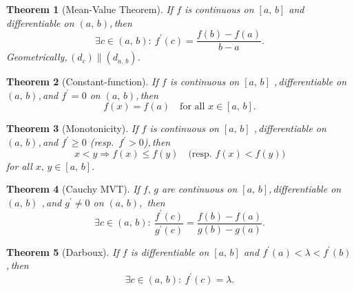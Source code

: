 \documentclass[11pt,reqno]{amsart}
\theoremstyle{redplain}
\newtheorem{theorem}{Theorem}
\begin{document}
\begin{theorem}[Mean-Value Theorem]
\label{thm:mvt} If $f$ is continuous on $[a,\,\allowbreak b]$ and
differentiable on $(a,\,\allowbreak b)$,\,\allowbreak then 
\begin{equation}  \label{eq:mvt}
\exists c\in(a,\,\allowbreak b):\ f^{\prime }(c)=\frac{f(b)-f(a)}{b-a}.
\end{equation}
Geometrically,\,\allowbreak $(d_c)\parallel (d_{a,\,\allowbreak b})$.
\end{theorem}

\begin{theorem}[Constant-function]
\label{thm:const} If $f$ is continuous on $[a,\,\allowbreak b]$%
,\,\allowbreak differentiable on $(a,\,\allowbreak b)$,\,\allowbreak and $%
f^{\prime }=0$ on $(a,\,\allowbreak b)$,\,\allowbreak then 
\begin{equation}  \label{eq:const}
f(x)=f(a)\quad\text{for all }x\in[a,\,\allowbreak b].
\end{equation}
\end{theorem}

\begin{theorem}[Monotonicity]
\label{thm:monotone} If $f$ is continuous on $[a,\,\allowbreak b]$%
,\,\allowbreak differentiable on $(a,\,\allowbreak b)$,\,\allowbreak and $%
f^{\prime }\ge0$ (resp.\ $f^{\prime }>0$),\,\allowbreak then 
\begin{equation}  \label{eq:monotone}
x<y\Rightarrow f(x)\le f(y)\quad\text{(resp.\ }f(x)<f(y)\text{)}
\end{equation}
for all $x,\,\allowbreak y\in[a,\,\allowbreak b]$.
\end{theorem}

\begin{theorem}[Cauchy MVT]
\label{thm:cauchy-mvt} If $f,\,\allowbreak g$ are continuous on $%
[a,\,\allowbreak b]$,\,\allowbreak differentiable on $(a,\,\allowbreak b)$%
,\,\allowbreak and $g^{\prime }\ne0$ on $(a,\,\allowbreak b)$,\,\allowbreak
then 
\begin{equation}  \label{eq:cauchy-mvt}
\exists c\in(a,\,\allowbreak b):\ \frac{f^{\prime }(c)}{g^{\prime }(c)}=%
\frac{f(b)-f(a)}{g(b)-g(a)}.
\end{equation}
\end{theorem}

\begin{theorem}[Darboux]
\label{thm:darboux} If $f$ is differentiable on $[a,\,\allowbreak b]$ and $%
f^{\prime }(a)<\lambda<f^{\prime }(b)$,\,\allowbreak then 
\begin{equation}  \label{eq:darboux}
\exists c\in(a,\,\allowbreak b):\ f^{\prime }(c)=\lambda.
\end{equation}
\end{theorem}
\end{document}
